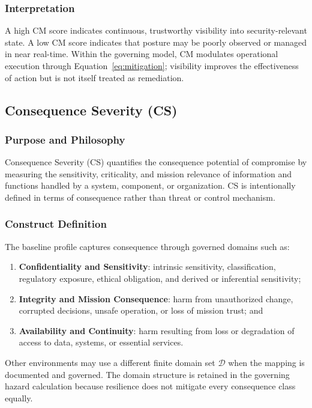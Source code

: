 \documentclass[11pt]{article}
\begin{document}
\subsubsection{Interpretation}
A high CM score indicates continuous, trustworthy visibility into security-relevant
state. A low CM score indicates that posture may be poorly observed or managed in near
real-time. Within the governing model, CM modulates operational execution through
Equation~\ref{eq:mitigation}; visibility improves the effectiveness of action but is not
itself treated as remediation.

\subsection{Consequence Severity (CS)}
\subsubsection{Purpose and Philosophy}
Consequence Severity (CS) quantifies the consequence potential of compromise by measuring
the sensitivity, criticality, and mission relevance of information and functions handled
by a system, component, or organization. CS is intentionally defined in terms of
consequence rather than threat or control mechanism.

\subsubsection{Construct Definition}
The baseline profile captures consequence through governed domains such as:
\begin{enumerate}
  \item \textbf{Confidentiality and Sensitivity}: intrinsic sensitivity, classification,
    regulatory exposure, ethical obligation, and derived or inferential sensitivity;
  \item \textbf{Integrity and Mission Consequence}: harm from unauthorized change,
    corrupted decisions, unsafe operation, or loss of mission trust; and
  \item \textbf{Availability and Continuity}: harm resulting from loss or degradation of
    access to data, systems, or essential services.
\end{enumerate}
Other environments may use a different finite domain set $\mathcal{D}$ when the mapping
is documented and governed. The domain structure is retained in the governing hazard
calculation because resilience does not mitigate every consequence class equally.
\end{document}

